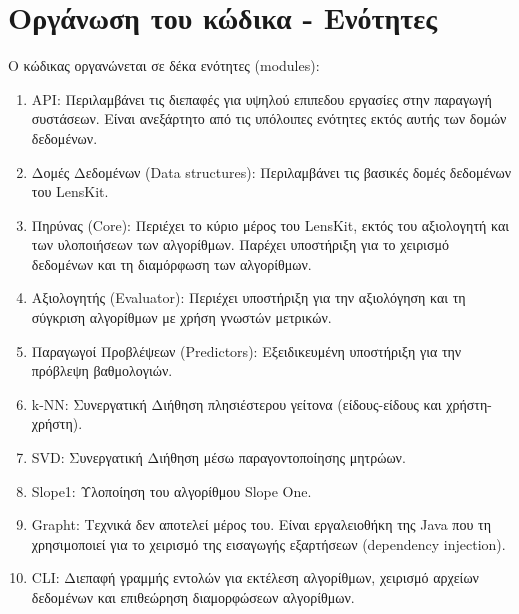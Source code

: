 \section{Οργάνωση του κώδικα - Ενότητες}
Ο κώδικας οργανώνεται σε δέκα ενότητες ({\en modules}):
\begin{enumerate}
 \item {\en API}: Περιλαμβάνει τις διεπαφές για υψηλού επιπεδου εργασίες στην παραγωγή συστάσεων. Είναι ανεξάρτητο από τις υπόλοιπες ενότητες εκτός αυτής των δομών δεδομένων.
 \item Δομές Δεδομένων ({\en Data structures}): Περιλαμβάνει τις βασικές δομές δεδομένων του {\en LensKit}.
 \item Πηρύνας ({\en Core}): Περιέχει το κύριο μέρος του {\en LensKit}, εκτός του αξιολογητή και των υλοποιήσεων των αλγορίθμων. Παρέχει υποστήριξη για το χειρισμό δεδομένων και τη διαμόρφωση των αλγορίθμων.
 \item Αξιολογητής ({\en Evaluator}): Περιέχει υποστήριξη για την αξιολόγηση και τη σύγκριση αλγορίθμων με χρήση γνωστών μετρικών.
 \item Παραγωγοί Προβλέψεων ({\en Predictors}): Εξειδικευμένη υποστήριξη για την πρόβλεψη βαθμολογιών.
 \item {\en k-NN}: Συνεργατική Διήθηση πλησιέστερου γείτονα (είδους-είδους και χρήστη-χρήστη).
 \item {\en SVD}: Συνεργατική Διήθηση μέσω παραγοντοποίησης μητρώων. 
 \item {\en Slope1:} Υλοποίηση του αλγορίθμου {\en Slope One}.
 \item {\en Grapht}: Τεχνικά δεν αποτελεί μέρος του. Είναι εργαλειοθήκη της {\en Java} που τη χρησιμοποιεί για το χειρισμό της εισαγωγής εξαρτήσεων ({\en dependency injection}).
 \item {\en CLI:} Διεπαφή γραμμής εντολών για εκτέλεση αλγορίθμων, χειρισμό αρχείων δεδομένων και επιθεώρηση διαμορφώσεων αλγορίθμων.
\end{enumerate}

